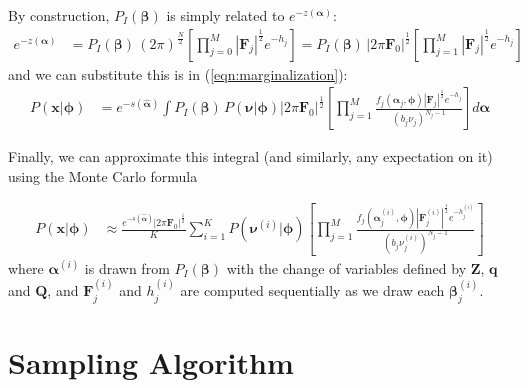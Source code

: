 \documentclass{amsart}
\newcommand{\bm}[1]{\ensuremath{\boldsymbol{#1}}}
\newcommand{\eqnref}[1]{(\ref{#1})}
\begin{document}
By construction, $P_I(\bm{\beta})$ is simply related to
$e^{-z(\bm{\alpha})}$:
\begin{align}
  e^{-z(\bm{\alpha})} &= P_I(\bm{\beta})\,(2\pi)^{\frac{N}{2}}\! \left[
    \prod_{j=0}^M \left|\bm{F}_j\right|^{\frac{1}{2}}\! e^{-h_j}
  \right]
  = P_I(\bm{\beta})\,\left|2\pi\bm{F}_0\right|^{\frac{1}{2}}\!
  \left[\prod_{j=1}^M \left|\bm{F}_j\right|^{\frac{1}{2}}\!e^{-h_j} \right] 
\end{align}
and we can substitute this is in \eqnref{eqn:marginalization}:
\begin{align}
  P(\bm{x}|\bm{\phi}) &=
  e^{-s(\hat{\bm{\alpha}})}\int
  P_I(\bm{\beta})\,
  P(\bm{\nu}|\bm{\phi})\left|2\pi\bm{F}_0\right|^{\frac{1}{2}}
  \left[
    \prod_{j=1}^M
    \frac{f_j(\bm{\alpha}_j,\bm{\phi})
      \left|\bm{F}_j\right|^{\frac{1}{2}}
      e^{-h_j}}
         {\left(b_j\nu_j\right)^{N_j-1}}
         \right]
  d\bm{\alpha}
\end{align}

Finally, we can approximate this integral (and similarly, any expectation on
it) using the Monte Carlo formula

\begin{align}
  P(\bm{x}|\bm{\phi}) &\approx
  \frac{e^{-s(\hat{\bm{\alpha}})}\left|2\pi\bm{F}_0\right|^{\frac{1}{2}}}{K} \sum_{i=1}^K
  P(\bm{\nu}^{(i)}|\bm{\phi})
  \left[
    \prod_{j=1}^M
    \frac{
      f_j(\bm{\alpha}_j^{(i)},\bm{\phi})
      \left|\bm{F}_j^{(i)}\right|^{\frac{1}{2}}
      e^{-h_j^{(i)}}
    }{
      \left(b_j\nu_j^{(i)}\right)^{N_j-1}
    }
    \right]
  \label{eqn:montecarlo}
\end{align}
where $\bm{\alpha}^{(i)}$ is drawn from $P_I(\bm{\beta})$ with the
change of variables defined by $\bm{Z}$, $\bm{q}$ and $\bm{Q}$,
and $\bm{F}_j^{(i)}$ and $h_j^{(i)}$ are computed sequentially as we
draw each $\bm{\beta}_j^{(i)}$.

\section{Sampling Algorithm}
\end{document}
